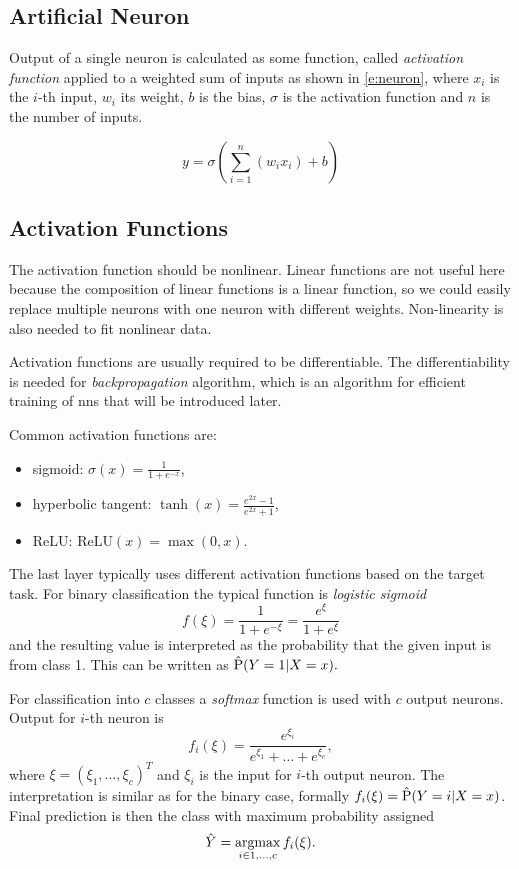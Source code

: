 \subsection{Artificial Neuron}

Output of a single neuron is calculated as some function, called \textit{activation function} applied to a weighted sum of inputs as shown in \autoref{e:neuron}, where $x_i$ is the $i$-th input, $w_i$ its weight, $b$ is the bias, $\sigma$ is the activation function and $n$ is the number of inputs.

\begin{equation}
    \label{e:neuron}
    y = \sigma\left(\sum_{i=1}^n (w_ix_i) + b\right)
\end{equation}

\subsection{Activation Functions}
The activation function should be nonlinear. Linear functions are not useful here because the composition of linear functions is a linear function, so we could easily replace multiple neurons with one neuron with different weights. Non-linearity is also needed to fit nonlinear data. 

Activation functions are usually required to be differentiable. The differentiability is needed for \textit{backpropagation} algorithm, which is an algorithm for efficient training of \glspl{nn} that will be introduced later.

Common activation functions are:
\begin{itemize}
    \item sigmoid: $\sigma(x) = \frac{1}{1+e^{-x}}$,
    \item hyperbolic tangent: $\tanh(x) = \frac{e^{2x}-1}{e^{2x}+1}$,
    \item ReLU: $\text{ReLU}(x)=\max(0, x)$.
\end{itemize}



The last layer typically uses different activation functions based on the target task. For binary classification the typical function is \textit{logistic sigmoid}
$$f(\xi) = \frac{1}{1 + e^{-\xi}} = \frac{e^\xi}{1 + e^\xi}$$
and the resulting value is interpreted as the probability that the given input is from class 1. This can be written as $\hat{\operatorname{P}}(Y=1|X=x).$

For classification into $c$ classes a \textit{softmax} function is used with $c$ output neurons. Output for $i$-th neuron is
$$
f_i(\xi) = \frac{e^{\xi_i}}{e^{\xi_1} + \hdots + e^{\xi_c}},
$$
where $\xi = (\xi_1, \hdots, \xi_c)^T$ and $\xi_i$ is the input for $i$-th output neuron. The interpretation is similar as for the binary case, formally $f_i(\xi) = \hat{\operatorname{P}}(Y=i|X=x)$. Final prediction is then the class with maximum probability assigned
$$
\hat{Y} = \operatorname*{argmax}_{i \in 1,\dots{},c} f_i(\xi).
$$


